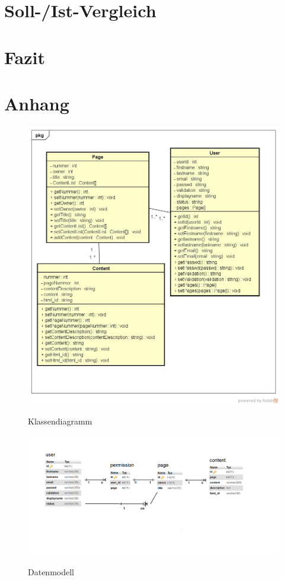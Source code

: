 \documentclass[10pt]{article}
\begin{document}
\section{Soll-/Ist-Vergleich}
\section{Fazit}
\section{Anhang}



\begin{figure}[h]
\caption{Klassendiagramm}
\includegraphics[width=\textwidth]{ClassDiagram}
\label{fig:classdiagram}
\end{figure}

\begin{figure}[h]
\caption{Datenmodell}
\includegraphics[width=\textwidth]{DatenmodellEPortfolio}
\label{fig:datenmodell}
\end{figure}
\end{document}

